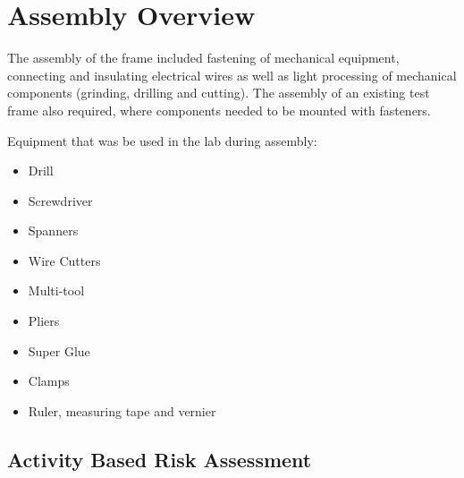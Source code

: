 \section*{Assembly Overview}

The assembly of the frame included fastening of mechanical equipment, connecting and insulating electrical wires as well as light processing of mechanical components (grinding, drilling and cutting). The assembly of an existing test frame also required, where components needed to be mounted with fasteners.

Equipment that was be used in the lab during assembly:
\begin{multicols}{2}
	\begin{itemize}
		\item Drill
		\item Screwdriver
		\item Spanners
		\item Wire Cutters
		\item Multi-tool
		\item Pliers
		\item Super Glue
		\item Clamps
		\item Ruler, measuring tape and vernier
	\end{itemize}
\end{multicols}

\subsection*{Activity Based Risk Assessment}

